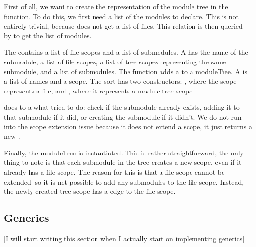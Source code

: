 First of all, we want to create the representation of the module tree in the  function.
To do this, we first need a list of the modules to declare.
This is not entirely trivial, because  does not get a list of files.
This relation is then queried by  to get the list of modules.

The  contains a list of file scopes and a list of submodules.
A  has the name of the submodule, a list of file scopes, a list of tree scopes representing the same submodule, and a list of submodules.
The function  adds a  to a moduleTree.
A  is a list of names and a scope.
The sort  has two constructors: , where the scope represents a file, and , where it represents a module tree scope.

 does to a  what  tried to do: check if the submodule already exists, adding it to that submodule if it did, or creating the submodule if it didn't.
We do not run into the scope extension issue because it does not extend a scope, it just returns a new .

Finally, the moduleTree is instantiated.
This is rather straightforward, the only thing to note is that each submodule in the tree creates a new scope, even if it already has a file scope.
The reason for this is that a file scope cannot be extended, so it is not possible to add any submodules to the file scope.
Instead, the newly created tree scope has a  edge to the file scope.




\subsection{\label{subsec:solution__statix__generics}Generics}
[I will start writing this section when I actually start on implementing generics]
